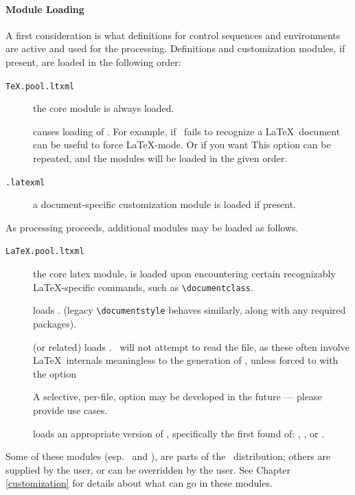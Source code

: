 \documentclass{book}
\begin{document}
\paragraph{Module Loading}
A first consideration is what definitions for control sequences and
environments are active and used for the processing.
Definitions and customization modules, if present, are loaded in the following
order:
\begin{description}
  \item[\texttt{TeX.pool.ltxml}] the core module is always loaded.
  \item[] causes loading of .
    For example, if \LaTeXML\ fails to recognize a \LaTeX\ document 
     can be useful to force \LaTeX-mode.
    Or if you want
    This option can be repeated, and the modules will be loaded in the
    given order.
  \item[\texttt{.latexml}] a document-specific customization module
    is loaded if present.
\end{description}
As processing proceeds, additional modules may be loaded as follows.
\begin{description}
  \item[\texttt{LaTeX.pool.ltxml}] the core latex module, is loaded
    upon encountering certain recognizably \LaTeX-specific commands, such as
    \verb|\documentclass|.
  \item[]
     loads .
     (legacy \verb|\documentstyle| behaves similarly, along with any required packages).
  \item[] (or related) loads
    .  \LaTeXML\ will not
    attempt to read the  file, as these
    often involve \LaTeX\ internals meaningless to the generation of \XML,
    unless forced to with the option
    \begin{quote}
    \end{quote}
    A selective, per-file, option may be developed in the future --- please
    provide use cases.
  \item[] loads an appropriate version
     of , specifically the first found of:
    , , 
     or .
\end{description}
Some of these modules (esp.~ and ), are parts of
the \LaTeXML\ distribution; others are supplied by the user, or can be
overridden by the user.
See Chapter \ref{customization} for details about what can go in these modules.
\end{document}
